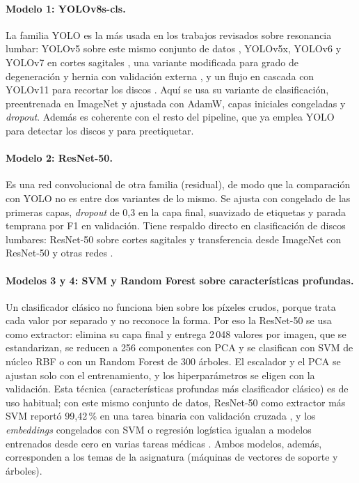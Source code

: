 \paragraph{Modelo 1: YOLOv8s-cls.} La familia YOLO es la más usada en los trabajos revisados sobre resonancia lumbar: YOLOv5 sobre este mismo conjunto de datos \cite{diagnostics2023}, YOLOv5x, YOLOv6 y YOLOv7 en cortes sagitales \cite{frontiers2023}, una variante modificada para grado de degeneración y hernia con validación externa \cite{wang2025}, y un flujo en cascada con YOLOv11 para recortar los discos \cite{sayed2025}. Aquí se usa su variante de clasificación, preentrenada en ImageNet y ajustada con AdamW, capas iniciales congeladas y \emph{dropout}. Además es coherente con el resto del pipeline, que ya emplea YOLO para detectar los discos y para preetiquetar.

\paragraph{Modelo 2: ResNet-50.} Es una red convolucional de otra familia (residual), de modo que la comparación con YOLO no es entre dos variantes de lo mismo. Se ajusta con congelado de las primeras capas, \emph{dropout} de 0,3 en la capa final, suavizado de etiquetas y parada temprana por F1 en validación. Tiene respaldo directo en clasificación de discos lumbares: ResNet-50 sobre cortes sagitales \cite{sayed2025} y transferencia desde ImageNet con ResNet-50 y otras redes \cite{alkubaisi2022}.

\paragraph{Modelos 3 y 4: SVM y Random Forest sobre características profundas.} Un clasificador clásico no funciona bien sobre los píxeles crudos, porque trata cada valor por separado y no reconoce la forma. Por eso la ResNet-50 se usa como extractor: elimina su capa final y entrega 2\,048 valores por imagen, que se estandarizan, se reducen a 256 componentes con PCA y se clasifican con SVM de núcleo RBF o con un Random Forest de 300 árboles. El escalador y el PCA se ajustan solo con el entrenamiento, y los hiperparámetros se eligen con la validación. Esta técnica (características profundas más clasificador clásico) es de uso habitual; con este mismo conjunto de datos, ResNet-50 como extractor más SVM reportó 99,42\,\% en una tarea binaria con validación cruzada \cite{sari2024}, y los \emph{embeddings} congelados con SVM o regresión logística igualan a modelos entrenados desde cero en varias tareas médicas \cite{khoiwal2024}. Ambos modelos, además, corresponden a los temas de la asignatura (máquinas de vectores de soporte y árboles).


